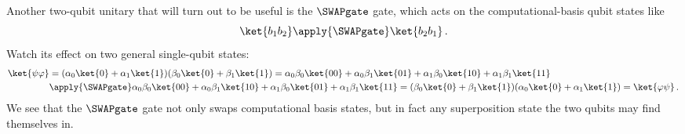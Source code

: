     Another two-qubit unitary that will turn out to be useful is the $\SWAPgate$
      gate, which acts on the computational-basis qubit states like 
    \[
      \ket{b_1 b_2} \apply{\SWAPgate} \ket{b_2 b_1}\, .
    \]
    Watch its effect on two general single-qubit states:
    \begin{align*}
      \ket{\psi\varphi} &= (\alpha_0 \ket{0} + \alpha_1 \ket{1}) (\beta_0 \ket{0} + \beta_1 \ket{1}) 
        = \alpha_0 \beta_0 \ket{00} + \alpha_0 \beta_1 \ket{01} +
        \alpha_1 \beta_0 \ket{10} + \alpha_1 \beta_1 \ket{11} \\
      &\apply{\SWAPgate} \alpha_0 \beta_0 \ket{00} + \alpha_0 \beta_1 \ket{10} +
        \alpha_1 \beta_0 \ket{01} + \alpha_1 \beta_1 \ket{11} = 
        (\beta_0 \ket{0} + \beta_1 \ket{1}) (\alpha_0 \ket{0} +
        \alpha_1 \ket{1}) = \ket{\varphi\psi}\, .
    \end{align*}
    We see that the $\SWAPgate$ gate not only swaps computational basis states,
      but in fact any superposition state the two qubits may find themselves in.

